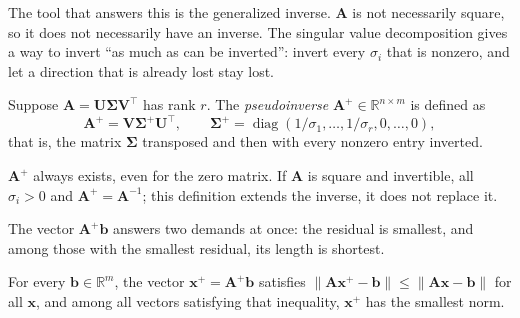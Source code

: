 The tool that answers this is the generalized inverse. $\mathbf{A}$ is not necessarily square, so it
does not necessarily have an inverse. The singular value decomposition gives a way to invert ``as much
as can be inverted'': invert every $\sigma_{i}$ that is nonzero, and let a direction that is
already lost stay lost.


\begin{definisi}[Pseudoinverse]
Suppose $\mathbf{A}=\mathbf{U}\boldsymbol{\Sigma}\mathbf{V}^{\top}$ has rank $r$.
The \emph{pseudoinverse} $\mathbf{A}^{+}\in\mathbb{R}^{n\times m}$ is defined as
\[
  \mathbf{A}^{+}=\mathbf{V}\boldsymbol{\Sigma}^{+}\mathbf{U}^{\top},
  \qquad
  \boldsymbol{\Sigma}^{+}=\operatorname{diag}(1/\sigma_{1},\dots,1/\sigma_{r},0,\dots,0),
\]
that is, the matrix $\boldsymbol{\Sigma}$ transposed and then with every nonzero entry
inverted.
\end{definisi}

$\mathbf{A}^{+}$ always exists, even for the zero matrix. If $\mathbf{A}$ is square and
invertible, all $\sigma_{i}>0$ and $\mathbf{A}^{+}=\mathbf{A}^{-1}$; this definition
extends the inverse, it does not replace it.

The vector $\mathbf{A}^{+}\mathbf{b}$ answers two demands at once: the residual is smallest, and
among those with the smallest residual, its length is shortest.

\begin{teorema}
For every $\mathbf{b}\in\mathbb{R}^{m}$, the vector
$\mathbf{x}^{+}=\mathbf{A}^{+}\mathbf{b}$ satisfies
$\|\mathbf{A}\mathbf{x}^{+}-\mathbf{b}\|\le\|\mathbf{A}\mathbf{x}-\mathbf{b}\|$ for
all $\mathbf{x}$, and among all vectors satisfying that inequality,
$\mathbf{x}^{+}$ has the smallest norm.
\end{teorema}

